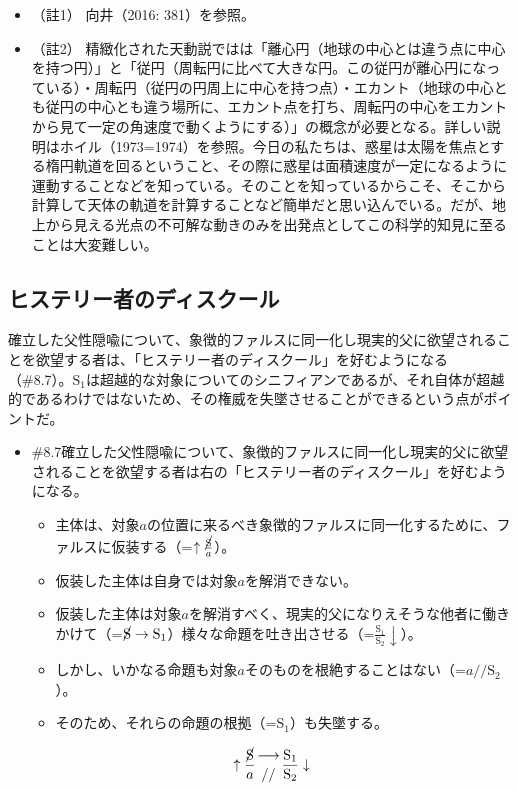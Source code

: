 \begin{itemize}
\tightlist
\item
  （註1） 向井（2016: 381）\cite{Mukai}を参照。
\item
  （註2）
  精緻化された天動説ではは「離心円（地球の中心とは違う点に中心を持つ円）」と「従円（周転円に比べて大きな円。この従円が離心円になっている）・周転円（従円の円周上に中心を持つ点）・エカント（地球の中心とも従円の中心とも違う場所に、エカント点を打ち、周転円の中心をエカントから見て一定の角速度で動くようにする）」の概念が必要となる。詳しい説明はホイル（1973=1974）\cite{Hoyle}を参照。今日の私たちは、惑星は太陽を焦点とする楕円軌道を回るということ、その際に惑星は面積速度が一定になるように運動することなどを知っている。そのことを知っているからこそ、そこから計算して天体の軌道を計算することなど簡単だと思い込んでいる。だが、地上から見える光点の不可解な動きのみを出発点としてこの科学的知見に至ることは大変難しい。
\end{itemize}

\subsection{ヒステリー者のディスクール}\label{ux30d2ux30b9ux30c6ux30eaux30fcux8005ux306eux30c7ux30a3ux30b9ux30afux30fcux30eb}

確立した父性隠喩について、象徴的ファルスに同一化し現実的父に欲望されることを欲望する者は、「ヒステリー者のディスクール」を好むようになる（\#8.7）。\(\textrm{S}_1\)は超越的な対象についてのシニフィアンであるが、それ自体が超越的であるわけではないため、その権威を失墜させることができるという点がポイントだ。

\begin{note}{}
  \begin{itemize}
    \tightlist
    \item{\#8.7}確立した父性隠喩について、象徴的ファルスに同一化し現実的父に欲望されることを欲望する者は右の「ヒステリー者のディスクール」を好むようになる。
      \begin{itemize}
        \tightlist
        \item 主体は、対象$a$の位置に来るべき象徴的ファルスに同一化するために、ファルスに仮装する（=$\uparrow\frac{\cancel{\textrm{S}}}{a}$）。
        \item 仮装した主体は自身では対象$a$を解消できない。
        \item 仮装した主体は対象$a$を解消すべく、現実的父になりえそうな他者に働きかけて（=$\cancel{\textrm{S}}\rightarrow\textrm{S}_1$）様々な命題を吐き出させる（=$\frac{\textrm{S}_1}{\textrm{S}_2}\downarrow$）。
        \item しかし、いかなる命題も対象$a$そのものを根絶することはない（=$a//\textrm{S}_2$）。
        \item そのため、それらの命題の根拠（=$\textrm{S}_1$）も失墜する。
      \end{itemize}

$$
\uparrow\frac{\cancel{\textrm{S}}}{a}\genfrac{}{}{0pt}{}{\longrightarrow}{//}\frac{\mathrm{S_1}}{\mathrm{S_2}}\downarrow
$$
  \end{itemize}
\end{note}

